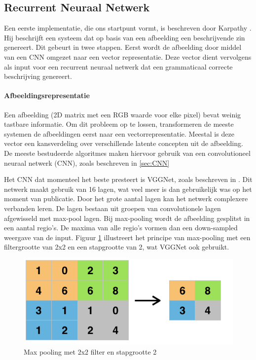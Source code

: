 \subsection{Recurrent Neuraal Netwerk}
Een eerste implementatie, die ons startpunt vormt, is beschreven door Karpathy \cite{Karpathy2015}. Hij beschrijft een systeem dat op basis van een afbeelding een beschrijvende zin genereert. Dit gebeurt in twee stappen. Eerst wordt de afbeelding door middel van een CNN omgezet naar een vector representatie. Deze vector dient vervolgens als input voor een recurrent neuraal netwerk dat een grammaticaal correcte beschrijving genereert.

\paragraph{Afbeeldingsrepresentatie}

Een afbeelding (2D matrix met een RGB waarde voor elke pixel) bevat weinig tastbare informatie. Om dit probleem op te lossen, transformeren de meeste systemen de afbeeldingen eerst naar een vectorrepresentatie. Meestal is deze vector een kansverdeling over verschillende latente concepten uit de afbeelding. De meeste bestudeerde algoritmes maken hiervoor gebruik van een convolutioneel neuraal netwerk (CNN), zoals beschreven in \ref{sec:CNN}

Het CNN dat momenteel het beste presteert is VGGNet, zoals beschreven in \cite{Arge2015}. Dit netwerk maakt gebruik van 16 lagen, wat veel meer is dan gebruikelijk was op het moment van publicatie. Door het grote aantal lagen kan het netwerk complexere verbanden leren. De lagen bestaan uit groepen van convolutionele lagen afgewisseld met max-pool lagen. Bij max-pooling wordt de afbeelding gesplitst in een aantal regio's. De maxima van alle regio's vormen dan een down-sampled weergave van de input. Figuur \ref{fig:maxpool}  illustreert het principe van max-pooling met een filtergrootte van 2x2 en een stapgrootte van 2, wat VGGNet ook gebruikt.

\begin{figure}[tb]
    \centering
    \includegraphics[width=0.6\linewidth]{Images/maxpool.png}
    \caption{Max pooling met 2x2 filter en stapgrootte 2}
    \label{fig:maxpool}
\end{figure}


